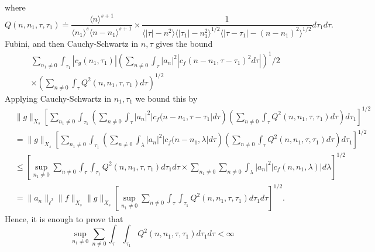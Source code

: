 \documentclass[12pt,reqno]{amsart}
\numberwithin{equation}{section}  %
\begin{document}
where
\begin{equation*}
Q(n, n_{1}, \tau, \tau_{1}) \doteq \frac{\langle n \rangle ^{s+1}}{\langle n_{1} \rangle ^{s} \langle
n-n_{1} \rangle ^{s+1}} 
\times \frac{1}{\langle | \tau | - n^{2} \rangle \langle |\tau_{1}|-n_{1}^{2} \rangle^{1/2}\langle | \tau -
\tau_{1}|-(n - n_{1})^{2}
\rangle^{1/2}} d \tau_1 d \tau.
\end{equation*}
Fubini, and then Cauchy-Schwartz in $n, \tau$ gives the bound
\begin{equation*}
\begin{split}
& \sum_{n_{1} \neq 0} \int_{\tau_{1}} | c_{g}(n_{1}, \tau_{1}) | 
\left( \sum_{n \neq 0} \int_{\tau} | a_{n} |^{2} | c_{f}(n - n_{1}, \tau - \tau_{1})^{2} d\tau | \right)^	1/2
\\
& \times\left( \sum_{n \neq 0} \int_{\tau} Q^{2}(n, n_{1}, \tau, \tau_{1}) d \tau \right)^{1/2}
\end{split}
\end{equation*}
Applying Cauchy-Schwartz in $n_{1}, \tau_{1}$ we bound this by
\begin{equation*}
\begin{split}
& \| g \|_{X_{s}} \left[ \sum_{n_{1} \neq 0} \int_{\tau_{1}}\left( \sum_{n \neq 0} \int_{\tau} | a_{n} |^{2} | c_{f}(n -n_{1}, \tau - \tau_{1} | d \tau \right) \left( \sum_{n \neq 0} \int_{\tau} Q^{2}(n, n_{1}, \tau, \tau_{1}) d \tau \right) d \tau_{1} \right]^{1/2}
\\
& = \| g \|_{X_{s}} \left[ \sum_{n_{1} \neq 0} \int_{\tau_{1}}\left( \sum_{n \neq 0} \int_{\lambda} | a_{n} |^{2} | c_{f}(n -n_{1}, \lambda | d \tau \right) \left( \sum_{n \neq 0} \int_{\tau} Q^{2}(n, n_{1}, \tau, \tau_{1}) d \tau \right) d \tau_{1} \right]^{1/2}
\\
& \le \left[ \sup_{n_{1} \neq 0} \sum_{n \neq 0} \int_{\tau} \int_{\tau_{1}} Q^{2}(n, n_{1}, \tau, \tau_{1}) d \tau_{1} d \tau \times \sum_{n_{1}\neq 0} \sum_{n \neq 0} \int_{\lambda} | a_{n} |^{2} | c_{f}(n, n_{1}, \lambda) | d \lambda \right]^{1/2}
\\
& = \| a_{n} \|_{\dot{\ell}^{2}} \| f \|_{X_{s}} \| g \|_{X_{s}}
\left[ \sup_{n_{1} \neq 0} \sum_{n \neq 0} \int_{\tau} \int_{\tau_{1}} Q^{2}(n, n_{1}, \tau, \tau_{1}) d \tau_{1} d \tau \right ]^{1/2}.
\end{split}
\end{equation*}
Hence, it is enough to prove that
\[ \sup_{n_{1} \neq 0} \sum_{n \neq 0} \int_{\tau} \int_{\tau_{1}} Q^{2}(n, n_{1}, \tau, \tau_{1}) d \tau_{1} d \tau < \infty \]
\end{document}
